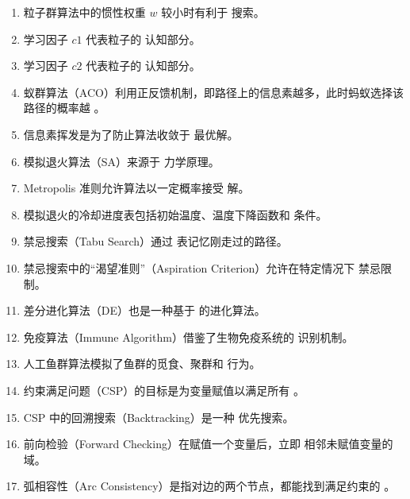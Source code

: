 \begin{enumerate}[resume,leftmargin=2em,itemsep=1pt]
\item 粒子群算法中的惯性权重 $w$ 较小时有利于 \underline{\hspace{3em}} 搜索。
\item 学习因子 $c1$ 代表粒子的 \underline{\hspace{3em}} 认知部分。
\item 学习因子 $c2$ 代表粒子的 \underline{\hspace{3em}} 认知部分。
\item 蚁群算法（ACO）利用正反馈机制，即路径上的信息素越多，此时蚂蚁选择该路径的概率越 \underline{\hspace{3em}}。
\item 信息素挥发是为了防止算法收敛于 \underline{\hspace{3em}} 最优解。
\item 模拟退火算法（SA）来源于 \underline{\hspace{3em}} 力学原理。
\item Metropolis 准则允许算法以一定概率接受 \underline{\hspace{3em}} 解。
\item 模拟退火的冷却进度表包括初始温度、温度下降函数和 \underline{\hspace{3em}} 条件。
\item 禁忌搜索（Tabu Search）通过 \underline{\hspace{3em}} 表记忆刚走过的路径。
\item 禁忌搜索中的“渴望准则”（Aspiration Criterion）允许在特定情况下 \underline{\hspace{3em}} 禁忌限制。
\item 差分进化算法（DE）也是一种基于 \underline{\hspace{3em}} 的进化算法。
\item 免疫算法（Immune Algorithm）借鉴了生物免疫系统的 \underline{\hspace{3em}} 识别机制。
\item 人工鱼群算法模拟了鱼群的觅食、聚群和 \underline{\hspace{3em}} 行为。
\item 约束满足问题（CSP）的目标是为变量赋值以满足所有 \underline{\hspace{3em}}。
\item CSP 中的回溯搜索（Backtracking）是一种 \underline{\hspace{3em}} 优先搜索。
\item 前向检验（Forward Checking）在赋值一个变量后，立即 \underline{\hspace{3em}} 相邻未赋值变量的域。
\item 弧相容性（Arc Consistency）是指对边的两个节点，都能找到满足约束的 \underline{\hspace{3em}}。

\end{enumerate}
